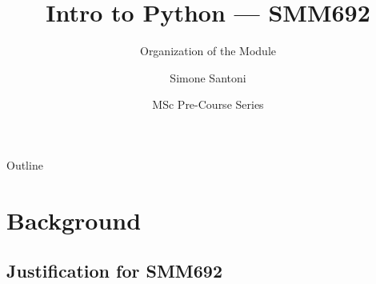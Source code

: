\documentclass[aspectratio=1610]{beamer}
\title{Intro to Python --- SMM692}
\subtitle{Organization of the Module}
\author{Simone Santoni}
\institute{Bayes Business School}
\date{MSc Pre-Course Series}
\begin{document}
\begin{frame}
	\titlepage
\end{frame}

\begin{frame}{Outline}
	\tableofcontents
\end{frame}


\section{Background}

\subsection{Justification for SMM692}
\end{document}
